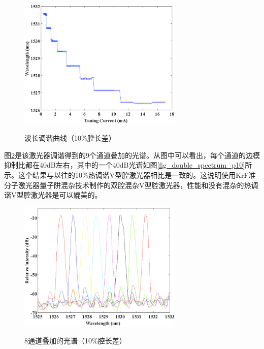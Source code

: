 \documentclass{ZJUthesis}
\begin{document}
\begin{figure}[!ht]
  \centering
  \includegraphics[width=0.7\textwidth]{./Pictures/double_tuning_p10.eps}\\
  \caption{波长调谐曲线（10\%腔长差）}
  \label{fig_double_tuning_p10}
\end{figure}

图\ref{fig_double_spectra_p10}是该激光器调谐得到的9个通道叠加的光谱。从图中可以看出，每个通道的边模抑制比都在40dB左右，其中的一个40dB光谱如图\ref{fig_double_spectrum_p10}所示。这个结果与以往的10\%热调谐V型腔激光器相比是一致的。这说明使用KrF准分子激光器量子阱混杂技术制作的双腔混杂V型腔激光器，性能和没有混杂的热调谐V型腔激光器是可以媲美的。

\begin{figure}[!ht]
  \centering
  \includegraphics[width=0.7\textwidth]{./Pictures/double_spectra_p10.eps}\\
  \caption{8通道叠加的光谱（10\%腔长差）}
  \label{fig_double_spectra_p10}
\end{figure}
\end{document}
